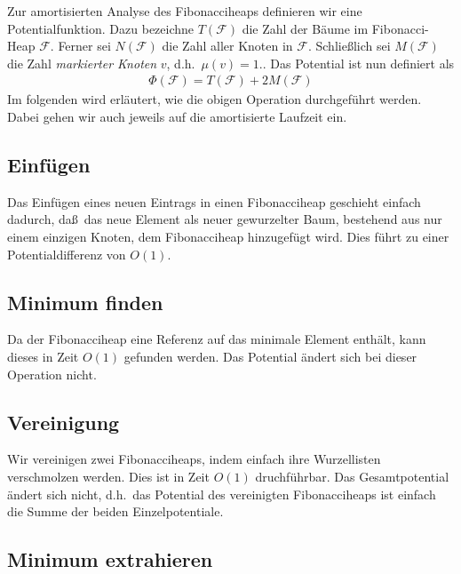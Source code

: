 \documentclass[10pt,reqno]{amsart}
\numberwithin{equation}{section}
\newcommand\cF{\mathcal F}
\begin{document}
		Zur amortisierten Analyse des Fibonacciheaps definieren wir eine Potentialfunktion.
		Dazu bezeichne $T(\cF)$ die Zahl der B\"aume im Fibonacci-Heap $\cF$.
		Ferner sei $N(\cF)$ die Zahl aller Knoten in $\cF$.
		Schlie\ss lich sei $M(\cF)$ die Zahl \emph{markierter Knoten} $v$, d.h.\ $\mu(v)=1$..
		Das Potential ist nun definiert als
		\begin{align}\label{eqfibophi}
					\Phi(\cF)=T(\cF)+2M(\cF)
				\end{align}
		Im folgenden wird erl\"autert, wie die obigen Operation durchgef\"uhrt werden.
		Dabei gehen wir auch jeweils auf die amortisierte Laufzeit ein.

\subsection{Einf\"ugen}\label{sec_fibo_insert}

Das Einf\"ugen eines neuen Eintrags in einen Fibonacciheap geschieht einfach dadurch, da\ss\ das neue Element als neuer gewurzelter Baum, bestehend aus nur einem einzigen Knoten, dem Fibonacciheap hinzugef\"ugt wird.
Dies f\"uhrt zu einer Potentialdifferenz von $O(1)$.

\subsection{Minimum finden}\label{sec_fibo_min}

Da der Fibonacciheap eine Referenz auf das minimale Element enth\"alt, kann dieses in Zeit $O(1)$ gefunden werden.
Das Potential \"andert sich bei dieser Operation nicht.

\subsection{Vereinigung}\label{sec_fibo_union}

Wir vereinigen zwei Fibonacciheaps, indem einfach ihre Wurzellisten verschmolzen werden.
Dies ist in Zeit $O(1)$ druchf\"uhrbar.
Das Gesamtpotential \"andert sich nicht, d.h.\ das Potential des vereinigten Fibonacciheaps ist einfach die Summe der beiden Einzelpotentiale.

\subsection{Minimum extrahieren}\label{sec_fibo_union}

\end{document}
